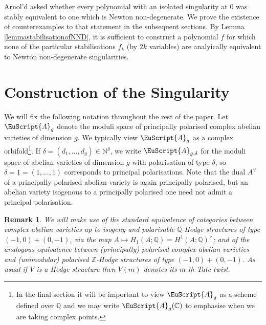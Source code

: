 \documentclass[11pt]{amsart}
\newtheorem{remark}[thm]{Remark}
\newcommand{\scrA}{\EuScript{A}}
\newcommand{\bZ}{\mathbb{Z}}
\newcommand{\bQ}{\mathbb{Q}}
\newcommand{\bC}{\mathbb{C}}
\newcommand{\bN}{\mathbb{N}}
\numberwithin{equation}{section}
\begin{document}
Arnol'd asked whether every polynomial with an isolated singularity at $0$ was stably equivalent to one which is Newton non-degenerate. We prove the existence of  counterexamples to that statement in the subsequent sections. By Lemma \ref{lemmastabilisationofNND}, it is sufficient to construct a polynomial $f$ for which none of the particular stabilisations $f_k$ (by $2k$ variables) are analyically equivalent to Newton non-degenerate singularities.

\section{Construction of the Singularity} \label{sectionConstruction}

We will fix the following notation throughout the rest of the paper. Let $\scrA_g$ denote the moduli space of principally polarised complex abelian varieties of dimension $g$. We typically view $\scrA_g$ as a complex orbifold\footnote{In the final section it will be important to view $\scrA_g$ as a scheme defined over $\bQ$ and we may write $\scrA_g(\bC)$ to emphasise when we are taking complex points.}. If $\delta = (d_1,\ldots,d_g) \in \bN^g$, we write $\scrA_{g,\delta}$ for the moduli space of abelian varieties of dimension $g$ with polarisation of type $\delta$; so $\delta = \underline{1} = (1,\ldots,1)$ corresponds to principal polarisations.  Note that the dual $A^{\vee}$ of a principally polarised abelian variety is again principally polarised, but an abelian variety isogenous to a principally polarised one need not admit a principal polarisation.

\begin{remark}\label{rmk:abvar-as-Hodge}
	We will make  use of the standard equivalence of categories \cite{deligne1971theorie2}  between complex abelian varieties up to isogeny and polarisable $\bQ$-Hodge structures of type $(-1,0) + (0,-1)$, via the map $A \mapsto H_1(A;\bQ) = H^1(A;\bQ)^{\vee}$; and of the analogous equivalence between (principally) polarised complex abelian varieties and (unimodular) polarised $\bZ$-Hodge structures of type $(-1,0) + (0,-1)$. As usual if $V$ is a  Hodge structure then $V(m)$ denotes its $m$-th Tate twist.
\end{remark}
\end{document}
